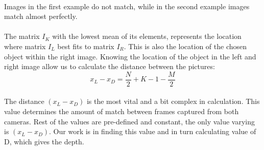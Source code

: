 \paragraph{} Images in the first example do not match, while in the second example images match almost perfectly.

\paragraph{} The matrix $I_{K}$ with the lowest mean of its elements, represents the location where matrix $I_{L}$ best fits to matrix $I_{R}$. This is also the location of the chosen object within the right image. Knowing the location of the object in the left and right image allow us to calculate the distance between the pictures:\\

\begin{equation}
x_{L}-x_{D}=\frac{N}{2}+K-1-\frac{M}{2}
\end{equation}\\

The distance $(x_{L}-x_{D})$ is the most vital and a bit complex in calculation. This value determines the amount of match between frames captured from both cameras.
Rest of the values are pre-defined and constant, the only value varying is $(x_{L}-x_{D})$. Our work is in finding this value and in turn calculating value of D, which gives the depth.
